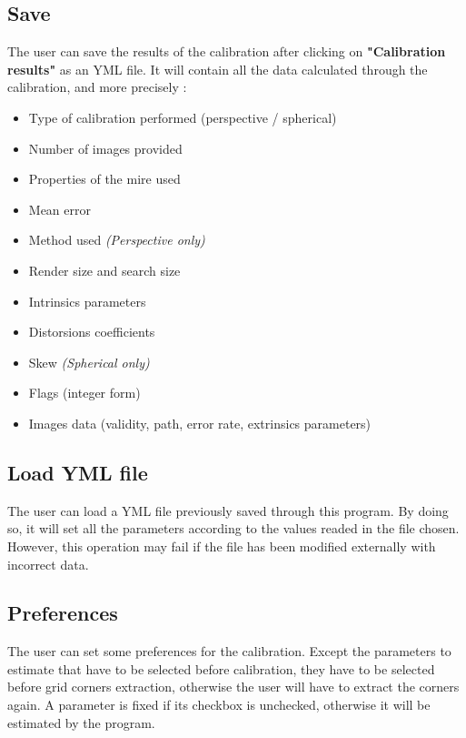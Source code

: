 \documentclass{article}
\begin{document}
\subsection{Save}

The user can save the results of the calibration after clicking on \textbf{"Calibration results"} as an YML file. It will contain all the data calculated through the calibration, and more precisely :
\begin{itemize}
    \item Type of calibration performed (perspective / spherical)
    \item Number of images provided
    \item Properties of the mire used
    \item Mean error
    \item Method used \textit{(Perspective only)}
    \item Render size and search size
    \item Intrinsics parameters
    \item Distorsions coefficients
    \item Skew \textit{(Spherical only)}
    \item Flags (integer form)
    \item Images data (validity, path, error rate, extrinsics parameters)
\end{itemize}

\subsection{Load YML file}

The user can load a YML file previously saved through this program. By doing so, it will set all the parameters according to the values readed in the file chosen.
However, this operation may fail if the file has been modified externally with incorrect data.

\subsection{Preferences}

The user can set some preferences for the calibration. Except the parameters to estimate that have to be selected before calibration, they have to be selected before grid corners extraction, otherwise the user will have to extract the corners again.\newline
A parameter is fixed if its checkbox is unchecked, otherwise it will be estimated by the program.
\end{document}
